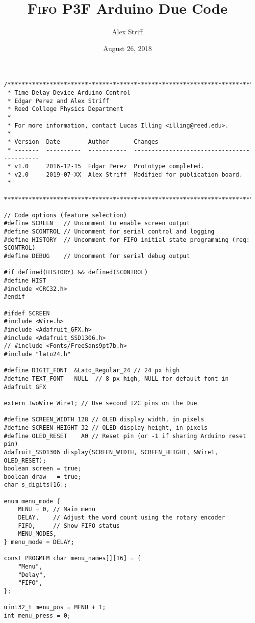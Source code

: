 \documentclass[11pt,letterpaper]{article}
\title{\textsc{Fifo} P3F Arduino Due Code}
\author{Alex Striff}
\date{August 26, 2018}
\begin{document}
\maketitle

\begin{verbatim}
/*******************************************************************************
 * Time Delay Device Arduino Control
 * Edgar Perez and Alex Striff
 * Reed College Physics Department
 *
 * For more information, contact Lucas Illing <illing@reed.edu>.
 *
 * Version  Date        Author       Changes
 * -------  ----------  -----------  -------------------------------------------
 * v1.0     2016-12-15  Edgar Perez  Prototype completed.
 * v2.0     2019-07-XX  Alex Striff  Modified for publication board.
 *
 ******************************************************************************/

// Code options (feature selection)
#define SCREEN   // Uncomment to enable screen output
#define SCONTROL // Uncomment for serial control and logging
#define HISTORY  // Uncomment for FIFO initial state programming (req: SCONTROL)
#define DEBUG    // Uncomment for serial debug output

#if defined(HISTORY) && defined(SCONTROL)
#define HIST
#include <CRC32.h>
#endif

#ifdef SCREEN
#include <Wire.h>
#include <Adafruit_GFX.h>
#include <Adafruit_SSD1306.h>
// #include <Fonts/FreeSans9pt7b.h>
#include "lato24.h"

#define DIGIT_FONT  &Lato_Regular_24 // 24 px high
#define TEXT_FONT   NULL  // 8 px high, NULL for default font in Adafruit GFX

extern TwoWire Wire1; // Use second I2C pins on the Due

#define SCREEN_WIDTH 128 // OLED display width, in pixels
#define SCREEN_HEIGHT 32 // OLED display height, in pixels
#define OLED_RESET    A0 // Reset pin (or -1 if sharing Arduino reset pin)
Adafruit_SSD1306 display(SCREEN_WIDTH, SCREEN_HEIGHT, &Wire1, OLED_RESET);
boolean screen = true;
boolean draw   = true;
char s_digits[16];

enum menu_mode {
    MENU = 0, // Main menu
    DELAY,    // Adjust the word count using the rotary encoder
    FIFO,     // Show FIFO status
    MENU_MODES,
} menu_mode = DELAY;

const PROGMEM char menu_names[][16] = {
    "Menu",
    "Delay",
    "FIFO",
};

uint32_t menu_pos = MENU + 1;
int menu_press = 0;


\end{verbatim}
\end{document}
